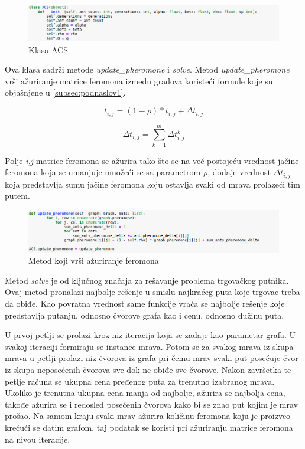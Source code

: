 \documentclass[a4paper]{article}
\begin{document}
\begin{figure}[h!]
\begin{center}
\includegraphics[width=1\columnwidth]{slika2.png}
\end{center}
\caption{Klasa ACS}
\label{fig:slika2}
\end{figure}


Ova klasa sadrži metode \textit{update\_pheromone} i \textit{solve}.
Metod \textit{update\_pheromone} vrši ažuriranje matrice feromona između gradova koristeći formule koje su objašnjene u \ref{subsec:podnaslov1}.


\begin{equation}
t_{i,j} = (1-\rho) * t_{i,j} + \Delta t_{i,j}
\end{equation}

\begin{equation}
\Delta t_{i,j}  = \sum_{k=1}^{m} \Delta t^k_{i,j}
\end{equation}

Polje \textit{i,j} matrice feromona se ažurira tako što se na već postojeću vrednost jačine feromona koja se umanjuje množeći se sa parametrom $\rho$, dodaje vrednost $\Delta t_{i,j}$ koja predstavlja sumu jačine feromona koju ostavlja svaki od mrava prolazeći tim putem.

\begin{figure}[h!]
\begin{center}
\includegraphics[width=1\columnwidth]{slika3.png}
\end{center}
\caption{Metod koji vrši ažuriranje feromona}
\label{fig:slika3}
\end{figure}


Metod \textit{solve} je od ključnog značaja za rešavanje problema trgovačkog putnika. Ovaj metod pronalazi najbolje rešenje u smislu najkraćeg puta koje trgovac treba da obiđe. Kao povratna vrednost same funkcije vraća se najbolje rešenje koje predstavlja putanju, odnosno čvorove grafa kao i cenu, odnosno dužinu puta. 

U prvoj petlji se prolazi kroz niz iteracija koja se zadaje kao parametar grafa. U svakoj iteraciji formiraju se instance mrava. Potom se za svakog mrava iz skupa mrava u petlji prolazi niz čvorova iz grafa pri čemu mrav svaki put posećuje čvor iz skupa neposećenih čvorova sve dok ne obiđe sve čvorove. Nakon završetka te petlje računa se ukupna cena pređenog puta za trenutno izabranog mrava. Ukoliko je trenutna ukupna cena manja od najbolje, ažurira se najbolja cena, takođe ažurira se i redosled posećenih čvorova kako bi se znao put kojim je mrav prošao. Na samom kraju svaki mrav ažurira količinu feromona koju je proizveo krećući se datim grafom, taj podatak se koristi pri ažuriranju matrice feromona na nivou iteracije. 
\end{document}
